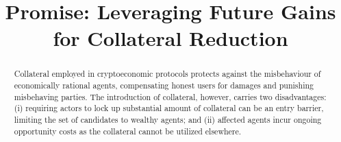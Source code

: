 \documentclass[runningheads]{llncs}
\newcommand{\sys}{Promise\xspace}
\newcommand{\dom}[1]{\todo[linecolor=green,backgroundcolor=green!25,bordercolor=green,inline,caption={}]{Comment by Dominik: #1}}
\begin{document}
\title{
\sys: Leveraging Future Gains for Collateral Reduction
} 
\author{
\institute{}
}


\date{}
\maketitle


\begin{abstract}
Collateral employed in cryptoeconomic protocols protects against the misbehaviour of economically rational agents, compensating honest users for damages and punishing misbehaving parties.
The introduction of collateral, however, carries two disadvantages: (i) requiring actors to lock up substantial amount of collateral can be an entry barrier, limiting the set of candidates to wealthy agents; and (ii) affected agents incur ongoing opportunity costs as the collateral cannot be utilized elsewhere.


\end{abstract}
\end{document}
